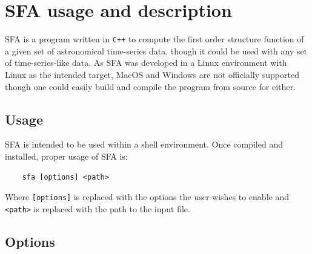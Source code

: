 \documentclass[12pt, oneside]{smuthesis}
\begin{document}
\section{\sc SFA usage and description} \label{usageDescription}

SFA is a program written in \verb|C++| to compute the first order structure function of a given set of astronomical time-series data, though it could be used with any set of time-series-like data. As SFA was developed in a Linux environment with Linux as the intended target, MacOS and Windows are not officially supported though one could easily build and compile the program from source for either.

\subsection{\sc Usage}

SFA is intended to be used within a shell environment. Once compiled and installed, proper usage of SFA is:
\begin{center}
	\begin{BVerbatim}
	sfa [options] <path>
	\end{BVerbatim}
\end{center}
Where \verb|[options]| is replaced with the options the user wishes to enable and \verb|<path>| is replaced with the path to the input file.

\subsection{\sc Options}
\end{document}
